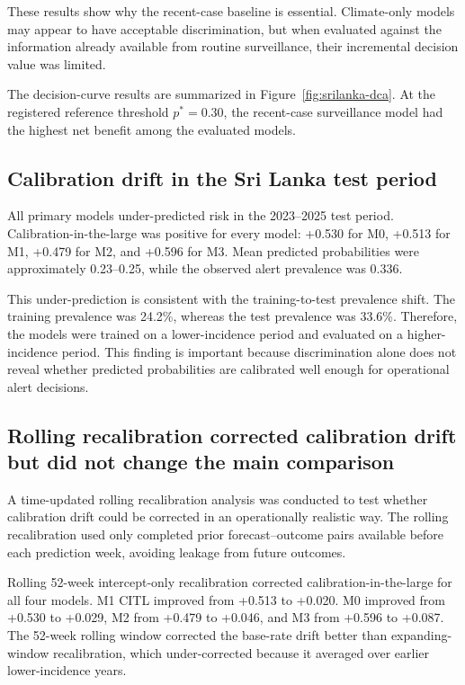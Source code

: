\documentclass[11pt,a4paper]{article}
\begin{document}
These results show why the recent-case baseline is essential. Climate-only models may appear to have acceptable discrimination, but when evaluated against the information already available from routine surveillance, their incremental decision value was limited.

The decision-curve results are summarized in Figure~\ref{fig:srilanka-dca}. At the registered reference threshold $p^*=0.30$, the recent-case surveillance model had the highest net benefit among the evaluated models.






\subsection{Calibration drift in the Sri Lanka test period}
\label{subsec:calibration-drift}

All primary models under-predicted risk in the 2023--2025 test period. Calibration-in-the-large was positive for every model: +0.530 for M0, +0.513 for M1, +0.479 for M2, and +0.596 for M3. Mean predicted probabilities were approximately 0.23--0.25, while the observed alert prevalence was 0.336.

This under-prediction is consistent with the training-to-test prevalence shift. The training prevalence was 24.2\%, whereas the test prevalence was 33.6\%. Therefore, the models were trained on a lower-incidence period and evaluated on a higher-incidence period. This finding is important because discrimination alone does not reveal whether predicted probabilities are calibrated well enough for operational alert decisions.

\subsection{Rolling recalibration corrected calibration drift but did not change the main comparison}
\label{subsec:rolling-recalibration}

A time-updated rolling recalibration analysis was conducted to test whether calibration drift could be corrected in an operationally realistic way. The rolling recalibration used only completed prior forecast--outcome pairs available before each prediction week, avoiding leakage from future outcomes.

Rolling 52-week intercept-only recalibration corrected calibration-in-the-large for all four models. M1 CITL improved from +0.513 to +0.020. M0 improved from +0.530 to +0.029, M2 from +0.479 to +0.046, and M3 from +0.596 to +0.087. The 52-week rolling window corrected the base-rate drift better than expanding-window recalibration, which under-corrected because it averaged over earlier lower-incidence years.
\end{document}
